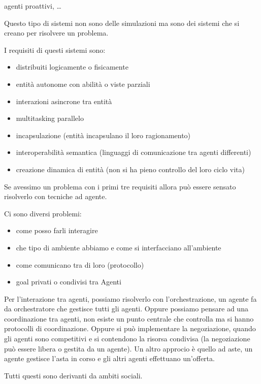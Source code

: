 \begin{definizione}
      agenti proattivi, \dots
\end{definizione}

Questo tipo di sistemi non sono delle simulazioni ma sono dei sistemi che si 
creano per risolvere un problema.

I requisiti di questi sistemi sono:
\begin{itemize}
      \item distribuiti logicamente o fisicamente
      \item entità autonome con abilità o viste parziali
      \item interazioni asincrone tra entità 
      \item multitasking parallelo
      \item incapsulazione (entità incapsulano il loro ragionamento)
      \item interoperabilità semantica (linguaggi di comunicazione tra agenti differenti)
      \item creazione dinamica di entità (non si ha pieno controllo del loro ciclo vita)
\end{itemize}
Se avessimo un problema con i primi tre requisiti allora può essere sensato risolverlo 
con tecniche ad agente.

Ci sono diversi problemi:
\begin{itemize}
      \item come posso farli interagire
      \item che tipo di ambiente abbiamo e come si interfacciano all'ambiente
      \item come comunicano tra di loro (protocollo)
      \item goal privati o condivisi tra Agenti
\end{itemize}

Per l'interazione tra agenti, possiamo risolverlo con l'orchestrazione, un agente 
fa da orchestratore che gestisce tutti gli agenti. Oppure possiamo pensare ad una 
coordinazione tra agenti, non esiste un punto centrale che controlla ma si hanno 
protocolli di coordinazione. Oppure si può implementare la negoziazione, quando 
gli agenti sono competitivi e si contendono la risorsa condivisa (la negoziazione 
può essere libera o gestita da un agente). Un altro approcio è quello ad aste,
un agente gestisce l'asta in corso e gli altri agenti effettuano un'offerta.

Tutti questi sono derivanti da ambiti sociali.

